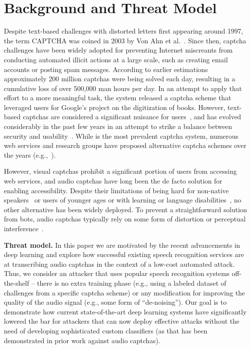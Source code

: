 \section{Background and Threat Model}
\label{sec:background}

Despite text-based challenges with distorted letters first appearing around 1997,
the term CAPTCHA was coined in 2003 by Von Ahn et al.~\cite{captcha}. Since 
then, captcha challenges have been widely adopted for preventing Internet 
miscreants from conducting automated illicit actions at a large scale, such as 
creating email accounts or posting spam messages. According to earlier estimations~\cite{captcha_stats}
approximately 200 million captchas were being solved each day, resulting in a
cumulative loss of over 500,000 man hours per day. In an attempt to apply that 
effort to a more meaningful task, the \re system released a captcha scheme that
leveraged users for Google's project on the digitization of books. However, 
text-based captchas are considered a significant nuisance for users~\cite{scientific_american},
and \re has evolved considerably in the past few years in an attempt to strike 
a balance between security and usability~\cite{recaptcha}. While \re is the
most prevalent captcha system, numerous web services and research groups have 
proposed alternative captcha schemes over the years (e.g.,~\cite{Chew04,asirra,dcaptcha}).

However, visual captchas prohibit a significant portion of users from accessing 
web services, and audio captchas have long been the de facto solution for
enabling accessibility. Despite their limitations of being hard for
non-native speakers~\cite{yan2008usability} or users of younger ages 
or with learning or language disabilities~\cite{schlaikjer2007dual},
no other alternative has been widely deployed.
To prevent a straightforward solution from bots, audio captchas 
typically rely on some form of distortion or perceptual interference~\cite{shinn2008object}.

\textbf{Threat model.} In this paper we are motivated by the recent advancements 
in deep learning and explore how successful existing speech recognition services
are at transcribing audio captchas in the context of a low-cost automated attack.
Thus, we consider an attacker that uses popular speech recognition systems off-the-shelf --
there is no extra training phase (e.g., using a labeled dataset of challenges from 
a specific captcha scheme) or any modification for improving the quality of the audio 
signal (e.g., some form of ``de-noising''). Our goal is to demonstrate how current 
state-of-the-art deep learning systems have significantly lowered the bar for attackers
that can now deploy effective attacks without the need of developing sophisticated 
custom classifiers (as that has been demonstrated in prior work against audio captchas).

